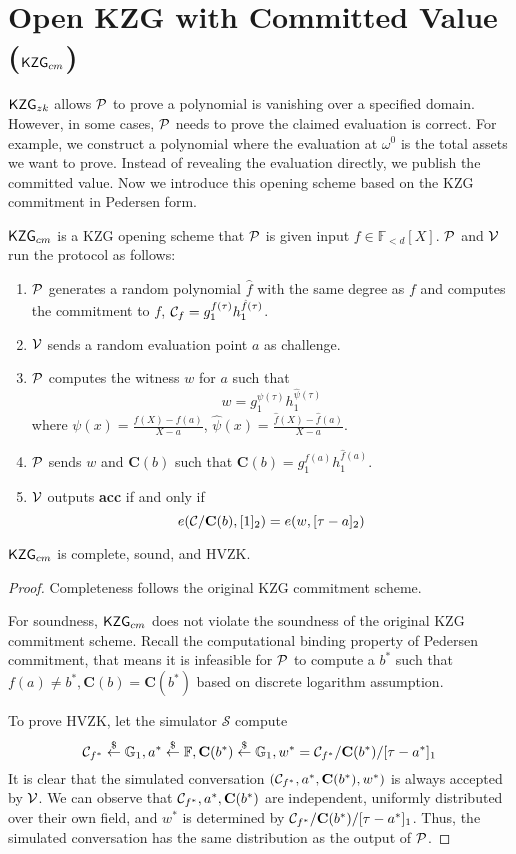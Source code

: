 \section{Open KZG with Committed Value ($\kzgcm$)}
\label{sec:kzgOpenComm}
$\mathsf{KZG}_{zk}$ allows $\mathcal{P}$ to prove a polynomial is vanishing over a specified domain. However, in some cases, $\mathcal{P}$ needs to prove the claimed evaluation is correct. For example, we construct a polynomial where the evaluation at $\omega^0$ is the total assets we want to prove. Instead of revealing the evaluation directly, we publish the committed value. Now we introduce this opening scheme based on the KZG commitment in Pedersen form.
\begin{definition}[$\kzgcm$]
$\kzgcm$ is a KZG opening scheme that $\mathcal{P}$ is given input $f\in\mathbb{F}_{<d}[X]$. $\mathcal{P}$ and $\mathcal{V}$ run the protocol as follows:
\begin{enumerate}
    \item $\mathcal{P}$ generates a random polynomial $\hat{f}$ with the same degree as $f$ and computes the commitment to $f$, $\mathcal{C}_f=g_1^{f(\tau)}h_1^{\hat{f}(\tau)}$.
    \item $\mathcal{V}$ sends a random evaluation point $a$ as challenge.
    \item $\mathcal{P}$ computes the witness $w$ for $a$ such that
    \[ w=g_1^{\psi(\tau)}h_1^{\hat\psi(\tau)} \]
    where $\psi(x)=\frac{f(X)-f(a)}{X-a}$, $\hat\psi(x)=\frac{\hat{f}(X)-\hat{f}(a)}{X-a}$.
    \item $\mathcal{P}$ sends $w$ and $\textbf{C}(b)$ such that $\textbf{C}(b)=g_1^{f(a)}h_1^{\hat{f}(a)}$.
    \item $\mathcal{V}$ outputs \textbf{acc} if and only if
    \[ e(\mathcal{C}/\textbf{C}(b),[1]_2)=e(w,[\tau-a]_2) \]
\end{enumerate}
\end{definition}
\begin{theorem}
\label{thm:kzgcm}
$\kzgcm$ is complete, sound, and HVZK.
\end{theorem}
\begin{proof}
Completeness follows the original KZG commitment scheme.

For soundness, $\kzgcm$ does not violate the soundness of the original KZG commitment scheme. Recall the computational binding property of Pedersen commitment, that means it is infeasible for $\mathcal{P}$ to compute a $b^*$ such that $f(a)\ne{b^*},\textbf{C}(b)=\textbf{C}(b^*)$ based on discrete logarithm assumption.

To prove HVZK, let the simulator $\mathcal{S}$ compute
$$
\mathcal{C}_{f^*}\stackrel{\$}{\leftarrow}\mathbb{G}_1,a^*\stackrel{\$}{\leftarrow}\mathbb{F},\textbf{C}(b^*)\stackrel{\$}{\leftarrow}\mathbb{G}_1,w^*=\mathcal{C}_{f^*}/\textbf{C}(b^*)/[\tau-a^*]_1
$$
It is clear that the simulated conversation $(\mathcal{C}_{f^*},a^*,\textbf{C}(b^*),w^*)$  is always accepted by $\mathcal{V}$. We can observe that $\mathcal{C}_{f^*},a^*,\textbf{C}(b^*)$ are independent, uniformly distributed over their own field, and $w^*$ is determined by $\mathcal{C}_{f^*}/\textbf{C}(b^*)/[\tau-a^*]_1$. Thus, the simulated conversation has the same distribution as the output of $\mathcal{P}$.
\end{proof}

